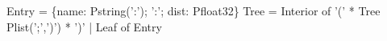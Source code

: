 \begin{code}\scriptsize
{} Entry = \{name: Pstring(':'); ':'; dist: Pfloat32\}
\mbox{}
 Tree =
  Interior of '(' * Tree Plist(';',')')  * ')'
| Leaf of Entry\end{code}

